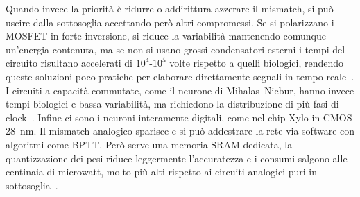 Quando invece la priorità è ridurre o addirittura azzerare il mismatch, si può uscire dalla sottosoglia accettando però altri compromessi. Se si polarizzano i MOSFET in forte inversione, si riduce la variabilità mantenendo comunque un'energia contenuta, ma se non si usano grossi condensatori esterni i tempi del circuito risultano accelerati di $10^4\text{-}10^5$ volte rispetto a quelli biologici, rendendo queste soluzioni poco pratiche per elaborare direttamente segnali in tempo reale~\cite{indiveri2011}. I circuiti a capacità commutate, come il neurone di Mihalas--Niebur, hanno invece tempi biologici e bassa variabilità, ma richiedono la distribuzione di più fasi di clock~\cite{indiveri2011}. Infine ci sono i neuroni interamente digitali, come nel chip Xylo in CMOS \SI{28}{\nano\meter}. Il mismatch analogico sparisce e si può addestrare la rete via software con algoritmi come BPTT. Però serve una memoria SRAM dedicata, la quantizzazione dei pesi riduce leggermente l'accuratezza e i consumi salgono alle centinaia di microwatt, molto più alti rispetto ai circuiti analogici puri in sottosoglia~\cite{li2024}.
